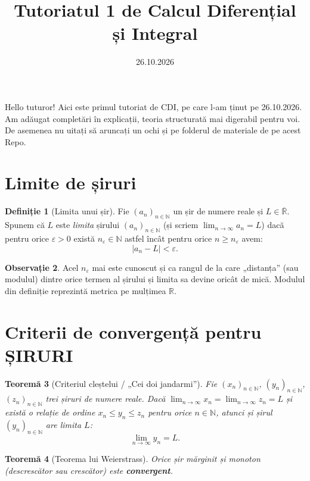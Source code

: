 \documentclass[11pt,a4paper]{article}
\title{\textbf{Tutoriatul 1 de Calcul Diferențial și Integral}}
\author{}
\date{26.10.2026}
\theoremstyle{definition}
\newtheorem{definition}{Definiție}[section]
\newtheorem{remark}[definition]{Observație}
\theoremstyle{plain}
\newtheorem{theorem}[definition]{Teoremă}
\theoremstyle{remark}
\newcommand{\R}{\mathbb{R}}
\newcommand{\N}{\mathbb{N}}
\newcommand{\eps}{\varepsilon}
\begin{document}
\maketitle

Hello tuturor! Aici este primul tutoriat de CDI, pe care l-am ținut pe 26.10.2026.
Am adăugat completări în explicații, teoria structurată mai digerabil pentru voi.
De asemenea nu uitați să aruncați un ochi și pe folderul de materiale de pe acest Repo.

\section{Limite de șiruri}

\begin{definition}[Limita unui șir]
    Fie $(a_n)_{n \in \N}$ un șir de numere reale și $L \in \overline{\R}$. Spunem că $L$ este \textit{limita} șirului $(a_n)_{n \in \N}$ (și scriem $\lim_{n \to \infty} a_n = L$) dacă pentru orice $\eps > 0$ există $n_\eps \in \N$ astfel încât pentru orice $n \ge n_\eps$ avem:
    \[
        |a_n - L| < \eps.
    \]
\end{definition}

\begin{remark} 
    Acel $n_\eps$ mai este cunoscut și ca rangul de la care „distanța” (sau modulul) dintre orice termen al șirului și limita sa devine oricât de mică. Modulul din definiție reprezintă metrica pe mulțimea $\R$.
\end{remark}

\section{Criterii de convergență pentru ȘIRURI}

\begin{theorem}[Criteriul cleștelui / „Cei doi jandarmi”]
    Fie $(x_n)_{n \in \N}$, $(y_n)_{n \in \N}$, $(z_n)_{n \in \N}$ trei șiruri de numere reale. Dacă $\lim_{n \to \infty} x_n = \lim_{n \to \infty} z_n = L$ și există o relație de ordine $x_n \leq y_n \leq z_n$ pentru orice $n \in \N$, atunci și șirul $(y_n)_{n \in \N}$ are limita $L$:
    \[
      \lim_{n \to \infty} y_n = L.
    \]
\end{theorem}

\begin{theorem}[Teorema lui Weierstrass]
    Orice șir mărginit și monoton (descrescător sau crescător) este \textbf{convergent}.
\end{theorem}
\end{document}
